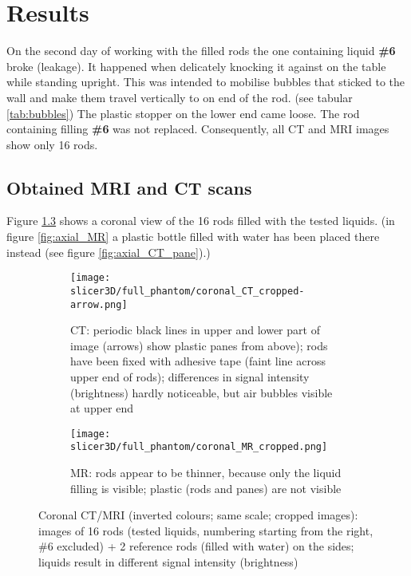 

\chapter{Results}

On the second day of working with the filled rods the one containing liquid \textbf{\#6} broke (leakage).
It happened when delicately knocking it against on the table while standing upright.
This was intended to mobilise bubbles that sticked to the wall and make them travel vertically to on end of the rod. (see tabular \ref{tab:bubbles})
The plastic stopper on the lower end came loose.
The rod containing filling \textbf{\#6} was not replaced.
Consequently, all CT and MRI images show only 16 rods.

\section{Obtained MRI and CT scans}
Figure \ref{fig:coronal} shows a coronal view of the 16 rods filled with the tested liquids.
(in figure \ref{fig:axial_MR} a plastic bottle filled with water has been placed there instead (see figure \ref{fig:axial_CT_pane}).)
 
\begin{figure}[!tbp]
  \begin{subfigure}[b]{\textwidth}
    \texttt{[image: slicer3D/full\_phantom/coronal\_CT\_cropped-arrow.png]}
    \caption{CT: periodic black lines in upper and lower part of image (arrows) show plastic panes from above); rods have been fixed with adhesive tape (faint line across upper end of rods); differences in signal intensity (brightness) hardly noticeable, but air bubbles visible at upper end}
    \label{fig:coronal_CT}
  \end{subfigure}
  \begin{subfigure}[b]{1\textwidth}
    \texttt{[image: slicer3D/full\_phantom/coronal\_MR\_cropped.png]}
    \caption{MR: rods appear to be thinner, because only the liquid filling is visible; plastic (rods and panes) are not visible}
    \label{fig:coronal_MR}
  \end{subfigure}
  \caption{Coronal CT/MRI (inverted colours; same scale; cropped images): images of 16 rods (tested liquids, numbering starting from the right, \#6 excluded) + 2 reference rods (filled with water) on the sides; liquids result in different signal intensity (brightness)}
  \label{fig:coronal}
\end{figure}

